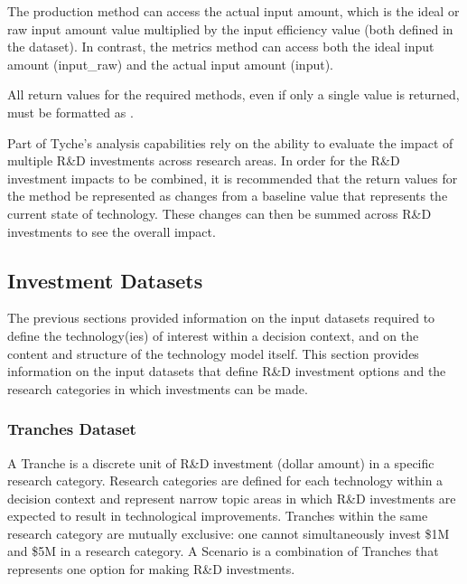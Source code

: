 \documentclass[letterpaper,10pt,english]{sphinxmanual}
\begin{document}
\sphinxAtStartPar
The production method can access the actual input amount, which is the ideal or raw input amount value multiplied by the input efficiency value (both defined in the  dataset). In contrast, the metrics method can access both the ideal input amount (input\_raw) and the actual input amount (input).

\sphinxAtStartPar
All return values for the required methods, even if only a single value is returned, must be formatted as .

\sphinxAtStartPar
Part of Tyche’s analysis capabilities rely on the ability to evaluate the impact of multiple R\&D investments across research areas. In order for the R\&D investment impacts to be combined, it is recommended that the return values for the  method be represented as changes from a baseline value that represents the current state of technology. These changes can then be summed across R\&D investments to see the overall impact.


\subsection{Investment Datasets}
\label{\detokenize{cheat-sheet:investment-datasets}}
\sphinxAtStartPar
The previous sections provided information on the input datasets required to define the technology(ies) of interest within a decision context, and on the content and structure of the technology model itself. This section provides information on the input datasets that define R\&D investment options and the research categories in which investments can be made.


\subsubsection{Tranches Dataset}
\label{\detokenize{cheat-sheet:tranches-dataset}}
\sphinxAtStartPar
A Tranche is a discrete unit of R\&D investment (dollar amount) in a specific research category. Research categories are defined for each technology within a decision context and represent narrow topic areas in which R\&D investments are expected to result in technological improvements. Tranches within the same research category are mutually exclusive: one cannot simultaneously invest \$1M and \$5M in a research category. A Scenario is a combination of Tranches that represents one option for making R\&D investments.
\end{document}
